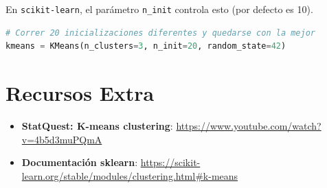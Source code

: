 \documentclass[12pt]{article}
\begin{document}
En \texttt{scikit-learn}, el parámetro \texttt{n\_init} controla esto (por defecto es 10).

\begin{lstlisting}[language=Python]
# Correr 20 inicializaciones diferentes y quedarse con la mejor
kmeans = KMeans(n_clusters=3, n_init=20, random_state=42)
\end{lstlisting}

\section{Recursos Extra}

\begin{itemize}
    \item \textbf{StatQuest: K-means clustering}: \url{https://www.youtube.com/watch?v=4b5d3muPQmA}
    \item \textbf{Documentación sklearn}: \url{https://scikit-learn.org/stable/modules/clustering.html#k-means}
\end{itemize}
\end{document}
